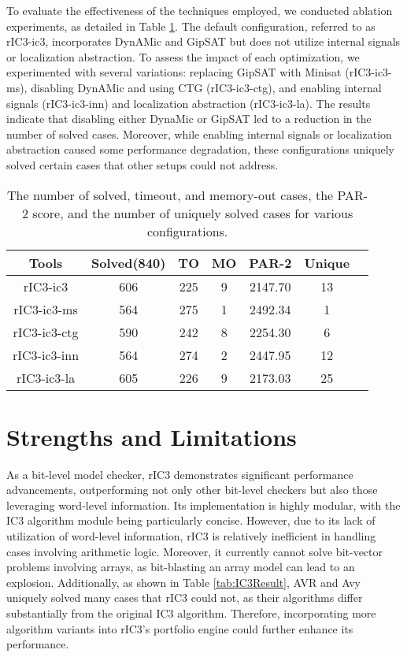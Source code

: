 \documentclass[runningheads]{llncs}
\begin{document}


To evaluate the effectiveness of the techniques employed, we conducted ablation experiments, as detailed in Table \ref{tab:Ablation}. The default configuration, referred to as rIC3-ic3, incorporates DynAMic and GipSAT but does not utilize internal signals or localization abstraction. To assess the impact of each optimization, we experimented with several variations: replacing GipSAT with Minisat (rIC3-ic3-ms), disabling DynAMic and using CTG (rIC3-ic3-ctg), and enabling internal signals (rIC3-ic3-inn) and localization abstraction (rIC3-ic3-la). The results indicate that disabling either DynaMic or GipSAT led to a reduction in the number of solved cases. Moreover, while enabling internal signals or localization abstraction caused some performance degradation, these configurations uniquely solved certain cases that other setups could not address.

\begin{table}[!t]
\centering
\setlength{\tabcolsep}{9pt}
\caption{The number of solved, timeout, and memory-out cases, the PAR-2 score, and the number of uniquely solved cases for various configurations.}
\label{tab:Ablation}
\begin{tabular}{c c c c c c c}
\hline
Tools & Solved(840) & TO & MO & PAR-2 & Unique \\
\hline
rIC3-ic3 & 606 & 225 & 9 & 2147.70 & 13 \\
\hdashline
rIC3-ic3-ms & 564 & 275 & 1 & 2492.34 & 1 \\
rIC3-ic3-ctg & 590 & 242 & 8 & 2254.30 & 6 \\
rIC3-ic3-inn & 564 & 274 & 2 & 2447.95 & 12 \\ 
rIC3-ic3-la & 605 & 226 & 9 & 2173.03 & 25 \\
\hline
\end{tabular}
\end{table}

\section{Strengths and Limitations}
As a bit-level model checker, rIC3 demonstrates significant performance advancements, outperforming not only other bit-level checkers but also those leveraging word-level information. Its implementation is highly modular, with the IC3 algorithm module being particularly concise. However, due to its lack of utilization of word-level information, rIC3 is relatively inefficient in handling cases involving arithmetic logic. Moreover, it currently cannot solve bit-vector problems involving arrays, as bit-blasting an array model can lead to an explosion. Additionally, as shown in Table \ref{tab:IC3Result}, AVR and Avy uniquely solved many cases that rIC3 could not, as their algorithms differ substantially from the original IC3 algorithm. Therefore, incorporating more algorithm variants into rIC3's portfolio engine could further enhance its performance.
\end{document}
